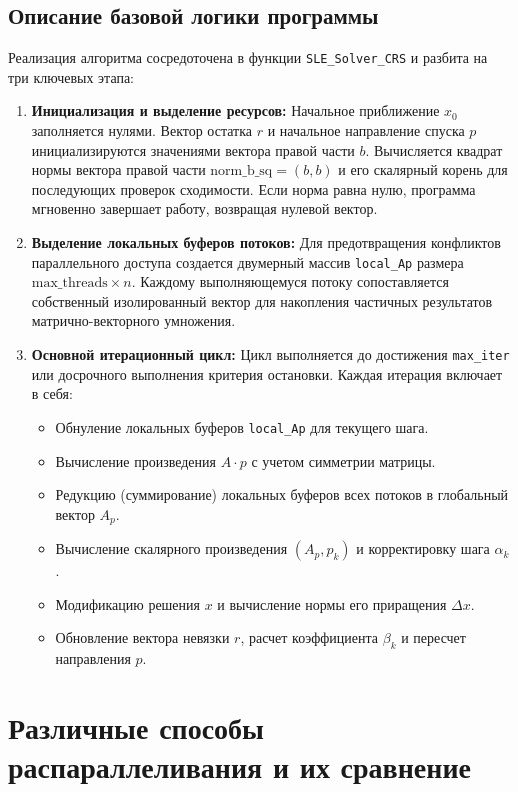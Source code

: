 \documentclass[12pt, a4paper]{article}
\begin{document}
\subsection{Описание базовой логики программы}
Реализация алгоритма сосредоточена в функции \texttt{SLE\_Solver\_CRS} и разбита на три ключевых этапа:
\begin{enumerate}
    \item \textbf{Инициализация и выделение ресурсов:} 
    Начальное приближение $x_0$ заполняется нулями. Вектор остатка $r$ и начальное направление спуска $p$ инициализируются значениями вектора правой части $b$. Вычисляется квадрат нормы вектора правой части $\text{norm\_b\_sq} = (b, b)$ и его скалярный корень для последующих проверок сходимости. Если норма равна нулю, программа мгновенно завершает работу, возвращая нулевой вектор.
    
    \item \textbf{Выделение локальных буферов потоков:}
    Для предотвращения конфликтов параллельного доступа создается двумерный массив \texttt{local\_Ap} размера $\text{max\_threads} \times n$. Каждому выполняющемуся потоку сопоставляется собственный изолированный вектор для накопления частичных результатов матрично-векторного умножения.
    
    \item \textbf{Основной итерационный цикл:}
    Цикл выполняется до достижения \texttt{max\_iter} или досрочного выполнения критерия остановки. Каждая итерация включает в себя:
    \begin{itemize}
        \item Обнуление локальных буферов \texttt{local\_Ap} для текущего шага.
        \item Вычисление произведения $A \cdot p$ с учетом симметрии матрицы.
        \item Редукцию (суммирование) локальных буферов всех потоков в глобальный вектор $A_p$.
        \item Вычисление скалярного произведения $(A_p, p_k)$ и корректировку шага $\alpha_k$.
        \item Модификацию решения $x$ и вычисление нормы его приращения $\Delta x$.
        \item Обновление вектора невязки $r$, расчет коэффициента $\beta_k$ и пересчет направления $p$.
    \end{itemize}
\end{enumerate}

\section{Различные способы распараллеливания и их сравнение}
\end{document}
